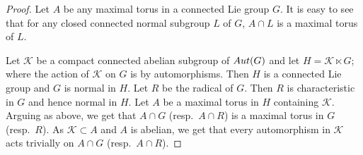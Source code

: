 \documentclass{amsart}
\numberwithin{equation}{section}
\newcommand{\Aut}{{\rm Aut}}
\newcommand{\K}{{\mathcal K}}
\theoremstyle{remark}
\begin{document}
\begin{proof} 
Let $A$ be any maximal torus in a connected Lie group $G$. It is easy to see that for any closed connected normal 
subgroup $L$ of $G$, $A\cap L$ is a maximal torus of $L$. 

Let $\K$ be a compact connected abelian subgroup of $\Aut(G)$ and let $H=\K\ltimes G$; where the action of $\K$ 
on $G$ is by automorphisms. Then $H$ is a connected Lie group and $G$ is normal in $H$. Let $R$ be the radical 
of $G$. Then $R$ is characteristic in $G$ and hence normal in $H$. Let $A$ be a maximal torus in $H$ containing 
$\K$. Arguing as above, we get that $A\cap G$ (resp.\  $A\cap R$) is a maximal torus in $G$ (resp.\ $R$). As 
$\K\subset A$ and $A$ is abelian, we get that every automorphism in $\K$ acts trivially on $A\cap G$ (resp.\ $A\cap R$). 
\end{proof}
\end{document}
